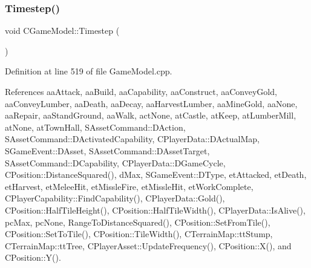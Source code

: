 \subsubsection{\texorpdfstring{Timestep()}{Timestep()}}
{\footnotesize\ttfamily void C\+Game\+Model\+::\+Timestep (\begin{DoxyParamCaption}{ }\end{DoxyParamCaption})}



Definition at line 519 of file Game\+Model.\+cpp.



References aa\+Attack, aa\+Build, aa\+Capability, aa\+Construct, aa\+Convey\+Gold, aa\+Convey\+Lumber, aa\+Death, aa\+Decay, aa\+Harvest\+Lumber, aa\+Mine\+Gold, aa\+None, aa\+Repair, aa\+Stand\+Ground, aa\+Walk, act\+None, at\+Castle, at\+Keep, at\+Lumber\+Mill, at\+None, at\+Town\+Hall, S\+Asset\+Command\+::\+D\+Action, S\+Asset\+Command\+::\+D\+Activated\+Capability, C\+Player\+Data\+::\+D\+Actual\+Map, S\+Game\+Event\+::\+D\+Asset, S\+Asset\+Command\+::\+D\+Asset\+Target, S\+Asset\+Command\+::\+D\+Capability, C\+Player\+Data\+::\+D\+Game\+Cycle, C\+Position\+::\+Distance\+Squared(), d\+Max, S\+Game\+Event\+::\+D\+Type, et\+Attacked, et\+Death, et\+Harvest, et\+Melee\+Hit, et\+Missle\+Fire, et\+Missle\+Hit, et\+Work\+Complete, C\+Player\+Capability\+::\+Find\+Capability(), C\+Player\+Data\+::\+Gold(), C\+Position\+::\+Half\+Tile\+Height(), C\+Position\+::\+Half\+Tile\+Width(), C\+Player\+Data\+::\+Is\+Alive(), pc\+Max, pc\+None, Range\+To\+Distance\+Squared(), C\+Position\+::\+Set\+From\+Tile(), C\+Position\+::\+Set\+To\+Tile(), C\+Position\+::\+Tile\+Width(), C\+Terrain\+Map\+::tt\+Stump, C\+Terrain\+Map\+::tt\+Tree, C\+Player\+Asset\+::\+Update\+Frequency(), C\+Position\+::\+X(), and C\+Position\+::\+Y().


